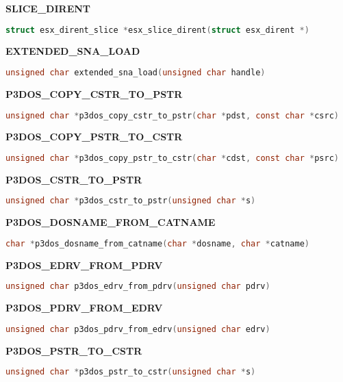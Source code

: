 \textbf{SLICE\_DIRENT}

\begin{lstlisting}[language=C]
struct esx_dirent_slice *esx_slice_dirent(struct esx_dirent *)
\end{lstlisting}

\textbf{EXTENDED\_SNA\_LOAD}

\begin{lstlisting}[language=C]
unsigned char extended_sna_load(unsigned char handle)
\end{lstlisting}

\textbf{P3DOS\_COPY\_CSTR\_TO\_PSTR}

\begin{lstlisting}[language=C]
unsigned char *p3dos_copy_cstr_to_pstr(char *pdst, const char *csrc)
\end{lstlisting}

\textbf{P3DOS\_COPY\_PSTR\_TO\_CSTR}

\begin{lstlisting}[language=C]
unsigned char *p3dos_copy_pstr_to_cstr(char *cdst, const char *psrc)
\end{lstlisting}

\textbf{P3DOS\_CSTR\_TO\_PSTR}

\begin{lstlisting}[language=C]
unsigned char *p3dos_cstr_to_pstr(unsigned char *s)
\end{lstlisting}

\textbf{P3DOS\_DOSNAME\_FROM\_CATNAME}

\begin{lstlisting}[language=C]
char *p3dos_dosname_from_catname(char *dosname, char *catname)
\end{lstlisting}

\textbf{P3DOS\_EDRV\_FROM\_PDRV}

\begin{lstlisting}[language=C]
unsigned char p3dos_edrv_from_pdrv(unsigned char pdrv)
\end{lstlisting}

\textbf{P3DOS\_PDRV\_FROM\_EDRV}

\begin{lstlisting}[language=C]
unsigned char p3dos_pdrv_from_edrv(unsigned char edrv)
\end{lstlisting}

\textbf{P3DOS\_PSTR\_TO\_CSTR}

\begin{lstlisting}[language=C]
unsigned char *p3dos_pstr_to_cstr(unsigned char *s)
\end{lstlisting}
